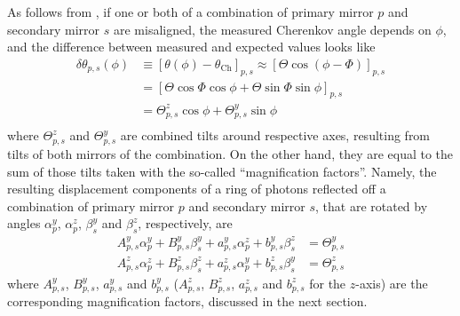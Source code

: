 As follows from , if one or both of a
combination of primary mirror $p$ and secondary mirror $s$ are  misaligned, the
measured Cherenkov angle depends on $\phi$, and the difference between measured
and expected values looks like
\begin{equation}
  \label{eq:DeltaTheta_ps}
  \begin{aligned}
    \delta \theta_{p,s} (\phi) & \equiv   [\theta(\phi)-\theta_{\mathrm{Ch}} ]_{p,s}
                                 \approx  [\varTheta\cos(\phi-\varPhi)       ]_{p,s} \\
                               & =        [\varTheta\cos\varPhi\cos\phi
                                 +         \varTheta\sin\varPhi\sin\phi      ]_{p,s} \\
                               & =         \varTheta^z_{p,s}\cos\phi
                                 +         \varTheta^y_{p,s}\sin\phi                 \\
  \end{aligned}
\end{equation}
where $\varTheta^z_{p,s}$ and $\varTheta^y_{p,s}$ are combined tilts around
respective axes, resulting from tilts of both mirrors of the combination. On the
other hand, they are equal to the sum of those tilts taken with the so-called
``magnification factors''. Namely, the resulting displacement components of a
ring of photons reflected off a combination of primary mirror $p$ and secondary
mirror $s$, that are rotated by angles $\alpha^y_p$, $\alpha^z_p$, $\beta^y_s$
and $\beta^z_s$, respectively, are
\begin{equation}
  \label{eq:theta0_y_z}
  \begin{aligned}
      A^y_{p,s}\alpha^y_p+B^y_{p,s}\beta^y_s
    + a^y_{p,s}\alpha^z_p+b^y_{p,s}\beta^z_s & = \varTheta^y_{p,s} \\
      A^z_{p,s}\alpha^z_p+B^z_{p,s}\beta^z_s
    + a^z_{p,s}\alpha^y_p+b^z_{p,s}\beta^y_s & = \varTheta^z_{p,s}
  \end{aligned}
\end{equation}
where $A^y_{p,s}$, $B^y_{p,s}$, $a^y_{p,s}$ and $b^y_{p,s}$ ($A^z_{p,s}$,
$B^z_{p,s}$, $a^z_{p,s}$ and $b^z_{p,s}$ for the $z$-axis) are the corresponding
magnification factors, discussed in the next section.

